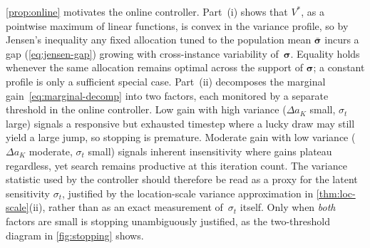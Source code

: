 \begin{remark}
\cref{prop:online} motivates the online controller.
Part~(i) shows that $V^*$, as a pointwise maximum of linear functions, is convex in the variance
profile, so by Jensen's
inequality any fixed allocation tuned to the population mean
$\bar{\boldsymbol{\sigma}}$ incurs a gap
(\cref{eq:jensen-gap}) growing with cross-instance variability
of~$\boldsymbol{\sigma}$.
Equality holds whenever the same allocation remains optimal across the
support of $\boldsymbol{\sigma}$; a constant profile is only a
sufficient special case.
Part~(ii) decomposes the marginal gain~\eqref{eq:marginal-decomp}
into two factors, each monitored by a separate
threshold in the online controller.
Low gain with high variance ($\Delta a_K$ small, $\sigma_t$ large) signals
a responsive but exhausted timestep where a lucky draw may still yield a large jump, so stopping is
premature.
Moderate gain with low variance ($\Delta a_K$ moderate, $\sigma_t$ small)
signals inherent insensitivity where gains plateau
regardless, yet search remains productive at this iteration count.
The variance statistic used by the controller should therefore be read
as a proxy for the latent sensitivity $\sigma_t$, justified by the
location-scale variance approximation in \cref{thm:loc-scale}(ii),
rather than as an exact measurement of~$\sigma_t$ itself.
Only when \emph{both} factors are small is stopping unambiguously
justified, as the two-threshold diagram in \cref{fig:stopping} shows.
\end{remark}

